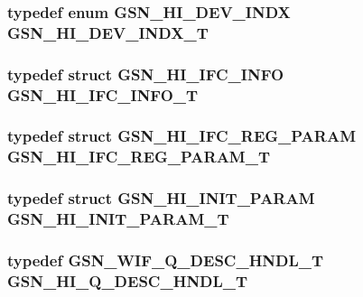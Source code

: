 \hypertarget{a00504_a8d08b031d5e7fe5884fe1e266ee7cc52}{
\subsubsection[{GSN\_\-HI\_\-DEV\_\-INDX\_\-T}]{\setlength{\rightskip}{0pt plus 5cm}typedef enum {\bf GSN\_\-HI\_\-DEV\_\-INDX} {\bf GSN\_\-HI\_\-DEV\_\-INDX\_\-T}}}
\label{a00504_a8d08b031d5e7fe5884fe1e266ee7cc52}
\hypertarget{a00504_a15e46ea325aab2acdb718f26b2a03009}{
\subsubsection[{GSN\_\-HI\_\-IFC\_\-INFO\_\-T}]{\setlength{\rightskip}{0pt plus 5cm}typedef struct {\bf GSN\_\-HI\_\-IFC\_\-INFO} {\bf GSN\_\-HI\_\-IFC\_\-INFO\_\-T}}}
\label{a00504_a15e46ea325aab2acdb718f26b2a03009}
\hypertarget{a00504_acdefdd55143ac5ad28ad1a8dcb797d24}{
\subsubsection[{GSN\_\-HI\_\-IFC\_\-REG\_\-PARAM\_\-T}]{\setlength{\rightskip}{0pt plus 5cm}typedef struct {\bf GSN\_\-HI\_\-IFC\_\-REG\_\-PARAM} {\bf GSN\_\-HI\_\-IFC\_\-REG\_\-PARAM\_\-T}}}
\label{a00504_acdefdd55143ac5ad28ad1a8dcb797d24}
\hypertarget{a00504_add93d994a6bf408b8e0743f1d249a7ca}{
\subsubsection[{GSN\_\-HI\_\-INIT\_\-PARAM\_\-T}]{\setlength{\rightskip}{0pt plus 5cm}typedef struct {\bf GSN\_\-HI\_\-INIT\_\-PARAM} {\bf GSN\_\-HI\_\-INIT\_\-PARAM\_\-T}}}
\label{a00504_add93d994a6bf408b8e0743f1d249a7ca}
\hypertarget{a00504_a73258a3b56bb06d739abb2feb99414a0}{
\subsubsection[{GSN\_\-HI\_\-Q\_\-DESC\_\-HNDL\_\-T}]{\setlength{\rightskip}{0pt plus 5cm}typedef {\bf GSN\_\-WIF\_\-Q\_\-DESC\_\-HNDL\_\-T} {\bf GSN\_\-HI\_\-Q\_\-DESC\_\-HNDL\_\-T}}}
\label{a00504_a73258a3b56bb06d739abb2feb99414a0}


